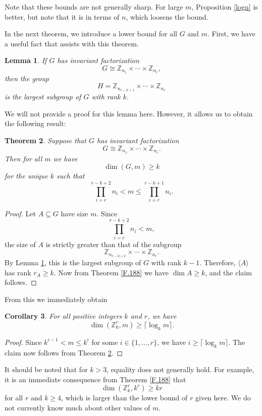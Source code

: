 \documentclass[11pt]{article}
\newcommand{\Z}{\mathbb{Z}}
\newtheorem{thm}{Theorem}
\newtheorem{lem}[thm]{Lemma}
\newtheorem{cor}[thm]{Corollary}
\begin{document}
Note that these bounds are not generally sharp. For large $m$, Proposition \ref{logn} is better, but note that it is in terms of $n$, which loosens the bound.

\newpage
In the next theorem, we introduce a lower bound for all $G$ and $m$. First, we have a useful fact that assists with this theorem.

\begin{lem}\label{subgroup}
If $G$ has invariant factorization
\[G\cong\Z_{n_1}\times\cdots\times\Z_{n_r},\]
then the group
\[H=\Z_{n_{r-k+1}}\times\cdots\times\Z_{n_r}\]
\vspace{-1.5em}
\noindent is the largest subgroup of $G$ with rank $k$.
\end{lem}
\vspace{1.5em}
We will not provide a proof for this lemma here. However, it allows us to obtain the following result:
\begin{thm}\label{lower}
Suppose that $G$ has invariant factorization
\[G\cong\Z_{n_1}\times\cdots\times\Z_{n_r}.\]
Then for all $m$ we have
\[\dim(G, m)\geq k\]
for the unique $k$ such that 
\[\prod_{i=r}^{r-k+2}\!n_i<m\leq\prod_{i=r}^{r-k+1}\!n_i.\]
\end{thm}
\begin{proof}
    Let $A\subseteq G$ have size $m$. Since
    \[\prod_{i=r}^{r-k+2}\!n_i<m,\]
    the size of $A$ is strictly greater than that of the subgroup
    \[\Z_{n_{r-k+2}}\times\cdots\times\Z_{n_r}.\]
    By Lemma \ref{subgroup}, this is the largest subgroup of $G$ with rank $k-1$. Therefore, $\langle A \rangle$ has rank $r_A\geq k$. Now from Theorem \ref{F.188} we have $\dim A\geq k$, and the claim follows.
\end{proof}

\newpage
From this we immediately obtain

\begin{cor}\label{Zkr}
For all positive integers $k$ and $r$, we have
\[\dim(\Z_k^r,m)\geq \lceil \log_k m\rceil.\]
\end{cor}
\begin{proof}
Since $k^{i-1}<m\leq k^i$ for some $i\in\{1,\ldots,r\}$, we have $i\geq\lceil\log_k m\rceil$. The claim now follows from Theorem \ref{lower}.
\end{proof}

It should be noted that for $k>3$, equality does not generally hold. For example, it is an immediate consequence from Theorem \ref{F.188} that
\[\dim(\Z_k^r,k^r)\geq kr\]
for all $r$ and $k\geq4$, which is larger than the lower bound of $r$ given here. We do not currently know much about other values of $m$.
\end{document}
